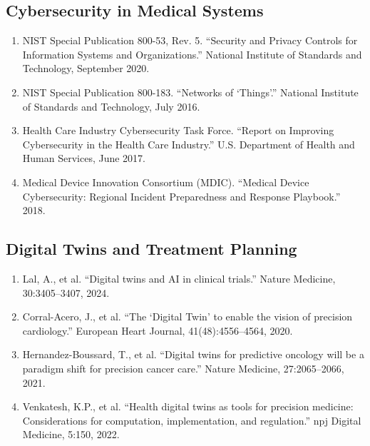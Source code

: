 \documentclass[11pt]{article}
\begin{document}
\subsection*{Cybersecurity in Medical Systems}

\begin{enumerate}[resume]
\item NIST Special Publication 800-53, Rev. 5. ``Security and Privacy Controls for Information Systems and Organizations.'' National Institute of Standards and Technology, September 2020.

\item NIST Special Publication 800-183. ``Networks of `Things'.'' National Institute of Standards and Technology, July 2016.

\item Health Care Industry Cybersecurity Task Force. ``Report on Improving Cybersecurity in the Health Care Industry.'' U.S. Department of Health and Human Services, June 2017.

\item Medical Device Innovation Consortium (MDIC). ``Medical Device Cybersecurity: Regional Incident Preparedness and Response Playbook.'' 2018.
\end{enumerate}

\subsection*{Digital Twins and Treatment Planning}

\begin{enumerate}[resume]
\item Lal, A., et al. ``Digital twins and AI in clinical trials.'' Nature Medicine, 30:3405--3407, 2024.

\item Corral-Acero, J., et al. ``The `Digital Twin' to enable the vision of precision cardiology.'' European Heart Journal, 41(48):4556--4564, 2020.

\item Hernandez-Boussard, T., et al. ``Digital twins for predictive oncology will be a paradigm shift for precision cancer care.'' Nature Medicine, 27:2065--2066, 2021.

\item Venkatesh, K.P., et al. ``Health digital twins as tools for precision medicine: Considerations for computation, implementation, and regulation.'' npj Digital Medicine, 5:150, 2022.
\end{enumerate}
\end{document}
